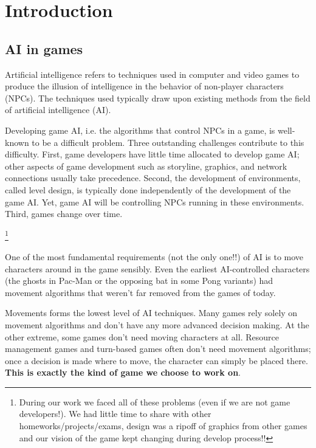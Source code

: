 \chapter{Introduction}
\section{AI in games}

Artificial intelligence refers to techniques used in computer and video games to produce the illusion of intelligence in the behavior of non-player characters (NPCs). The techniques used typically draw upon existing methods from the field of artificial intelligence (AI).

Developing game AI, i.e. the algorithms that control NPCs in a game, is well-known to be a difficult problem. Three outstanding challenges contribute to this difficulty. 
First, game developers have little time allocated to develop game AI; other aspects of game development such as storyline, graphics, and network connections usually take precedence. Second, the development of environments, called level design, is typically done independently of the development of the game AI. Yet, game AI will be controlling NPCs running in these environments. Third, games change over time.

\footnote{During our work we faced all of these problems (even if we are not game developers!). We had little time to share with other homeworks/projects/exams, design was a ripoff of graphics from other games and our vision of the game kept changing during develop process!!}

One of the most fundamental requirements (not the only one!!) of AI is to move characters around in the game sensibly. Even the earliest AI-controlled characters (the ghosts in Pac-Man or the opposing bat in some Pong variants) had movement algorithms that weren’t far removed from the games of today.

Movements forms the lowest level of AI techniques. Many games rely solely on movement algorithms and don’t have any more advanced decision making. At the other extreme, some games don’t need moving characters at all. Resource management games and turn-based games often don’t need movement algorithms; once a decision is made where to move, the character can simply be placed there.
\textbf{This is exactly the kind of game we choose to work on}.

